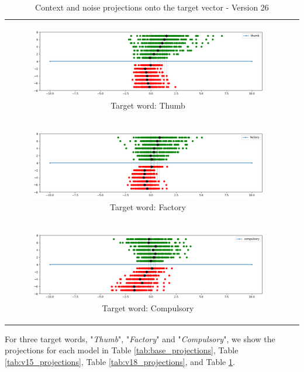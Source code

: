 \begin{table}[p]
  \centering
  \begin{tabular}{cc}
    \begin{subfigure}{0.95\textwidth}
      \includegraphics[width=\linewidth]{img/thumb_v26.png}
      \caption{Target word: Thumb}
    \end{subfigure} \\
    \begin{subfigure}{0.95\textwidth}
      \includegraphics[width=\linewidth]{img/factory_v26.png}
      \caption{Target word: Factory}
    \end{subfigure} \\
    \begin{subfigure}{0.95\textwidth}
      \includegraphics[width=\linewidth]{img/compulsory_v26.png}
      \caption{Target word: Compulsory}
    \end{subfigure} 
  \end{tabular}
  \caption{Context and noise projections onto the target vector - Version 26}
  \label{tab:v26_projections}
\end{table}

For three target words, "\textit{Thumb}", "\textit{Factory}" and "\textit{Compulsory}", we show the projections for each model in Table \ref{tab:base_projections}, Table \ref{tab:v15_projections}, Table \ref{tab:v18_projections}, and Table \ref{tab:v26_projections}.

